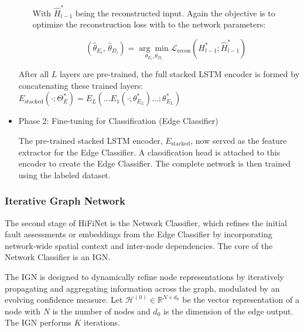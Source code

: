 \begin{itemize}
\begin{itemize}
      With \(\hat H^*_{l-1}\) being the reconstructed input. Again the objective is to optimize the reconstruction loss with to the network parameters:

      \[(\hat \theta_{E_l},\,\hat \theta_{D_l}) = \underset{\theta_{E_l}, \theta_{D_l}} {\arg\min} \mathcal L_{\text{recon}}(H^*_{l-1}; \hat H^*_{l-1})\]
  \end{itemize}
  After all \(L\) layers are pre-trained, the full stacked LSTM encoder is formed by concatenating these trained layers: \(E_\text{stacked}(\cdot; \Theta^*_{E}) = E_L(\ldots E_1(\cdot; \theta^*_{E_L}) \ldots;\theta^*_{E_L})\)
  
  \item Phase 2: Fine-tuning for Classification (Edge Classifier)

  The pre-trained stacked LSTM encoder, \(E_\text{stacked}\), now served as the feature extractor for the Edge Classifier. A classification head is attached to this encoder to create the Edge Classifier. The complete network is then trained using the labeled dataset.
\end{itemize}

\subsubsection{Iterative Graph Network}
The second stage of HiFiNet is the Network Classifier, which refines the initial fault assessments or embeddings from the Edge Classifier by incorporating network-wide spatial context and inter-node dependencies. The core of the Network Classifier is an IGN.

The IGN is designed to dynamically refine node representations by iteratively propagating and aggregating information across the graph, modulated by an evolving confidence measure. Let \(\mathcal{H}^{(0)} \in \mathbb{R}^{N \times d_0}\) be the vector representation of a node with \(N\) is the number of nodes and \(d_0\) is the dimension of the edge output. The IGN performs \(K\) iterations.


